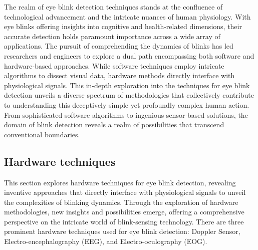 \documentclass[conference]{IEEEtran}
\begin{document}
The realm of eye blink detection techniques stands at the confluence of technological advancement and the intricate nuances of human physiology. With eye blinks offering insights into cognitive and health-related dimensions, their accurate detection holds paramount importance across a wide array of applications. The pursuit of comprehending the dynamics of blinks has led researchers and engineers to explore a dual path encompassing both software and hardware-based approaches. While software techniques employ intricate algorithms to dissect visual data, hardware methods directly interface with physiological signals. This in-depth exploration into the techniques for eye blink detection unveils a diverse spectrum of methodologies that collectively contribute to understanding this deceptively simple yet profoundly complex human action. From sophisticated software algorithms to ingenious sensor-based solutions, the domain of blink detection reveals a realm of possibilities that transcend conventional boundaries.

\subsection{Hardware techniques}
This section explores hardware techniques for eye blink detection, revealing inventive approaches that directly interface with physiological signals to unveil the complexities of blinking dynamics. Through the exploration of hardware methodologies, new insights and possibilities emerge, offering a comprehensive perspective on the intricate world of blink-sensing technology. There are three prominent hardware techniques used for eye blink detection: Doppler Sensor, Electro-encephalography (EEG), and Electro-oculography (EOG).
\end{document}
